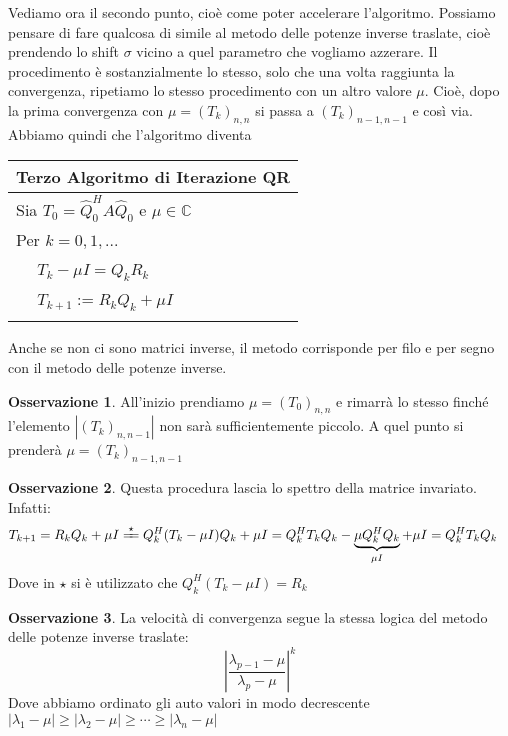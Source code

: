 \documentclass[11pt,a4paper,twoside]{article}
\theoremstyle{definition}
\newtheorem*{oss}{Osservazione}
\begin{document}
Vediamo ora il secondo punto, cioè come poter accelerare l'algoritmo.
Possiamo pensare di fare qualcosa di simile al metodo delle potenze inverse traslate, cioè prendendo lo shift $\sigma$ vicino a quel parametro che vogliamo azzerare. Il procedimento è sostanzialmente lo stesso, solo che una volta raggiunta la convergenza, ripetiamo lo stesso procedimento con un altro valore $\mu$. Cioè, dopo la prima convergenza con $\mu = (T_k)_{n,n}$ si passa a $(T_k)_{n-1,n-1}$ e così via.\\
Abbiamo quindi che l'algoritmo diventa

\begin{tabular}{l}
	\\
	\textbf{Terzo Algoritmo di Iterazione QR}\\
	\hline
	Sia $T_0 = \hat Q_0^HA \hat Q_0$ e $\mu \in \mathbb C$\\
	Per $k = 0,1,...$\\
	$\quad$ $T_k - \mu I = Q_kR_k$\\
	$\quad$ $T_{k+1} := R_kQ_k + \mu I$\\
	\\
\end{tabular}

Anche se non ci sono matrici inverse, il metodo corrisponde per filo e per segno con il metodo delle potenze inverse.

\begin{oss}
	All'inizio prendiamo $\mu = (T_0)_{n,n}$ e rimarrà lo stesso finché l'elemento $|(T_k)_{n,n-1}|$ non sarà sufficientemente piccolo. A quel punto si prenderà $\mu = (T_k)_{n-1,n-1}$
\end{oss}

\begin{oss}
	Questa procedura lascia lo spettro della matrice invariato. Infatti:
	\begin{align*}
		T_{k+1} &= R_kQ_k + \mu I \xlongequal{\star} Q^H_k(T_k - \mu I)Q_k + \mu I = Q_k^H T_k Q_k - \underbrace{\mu Q_k^H Q_k}_{\mu I} + \mu I = Q_k^H T_k Q_k
	\end{align*}
	Dove in $\star$ si è utilizzato che $Q^H_k(T_k - \mu I) = R_k$
\end{oss}

\begin{oss}
	La velocità di convergenza segue la stessa logica del metodo delle potenze inverse traslate:
	\[\left| \frac{\lambda_{p-1} -\mu}{\lambda_p -\mu} \right|^k\]
	Dove abbiamo ordinato gli auto valori in modo decrescente $|\lambda_1 - \mu|\geq |\lambda_2 - \mu|\geq \cdots \geq |\lambda_n-\mu|$
\end{oss}
\end{document}
